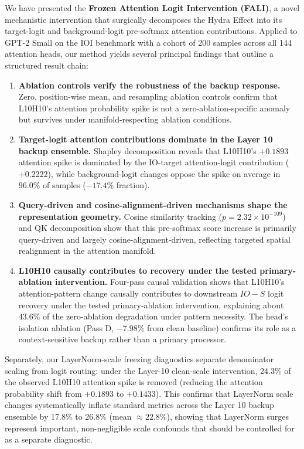 \documentclass[10pt]{article} %
\begin{document}
We have presented the \textbf{Frozen Attention Logit Intervention (FALI)}, a
novel mechanistic intervention that surgically decomposes the Hydra Effect into
its target-logit and background-logit pre-softmax attention contributions. Applied
to GPT-2 Small on the IOI benchmark with a cohort of 200 samples across all 144
attention heads, our method yields several principal findings that outline a structured result chain:

\begin{enumerate}
  \item \textbf{Ablation controls verify the robustness of the backup response.} Zero, position-wise mean, and resampling ablation controls confirm that L10H10's attention probability spike is not a zero-ablation-specific anomaly but survives under manifold-respecting ablation conditions.

  \item \textbf{Target-logit attention contributions dominate in the Layer 10 backup ensemble.} Shapley decomposition reveals that L10H10's $+0.1893$ attention spike is dominated by the IO-target attention-logit contribution ($+0.2222$), while background-logit changes oppose the spike on average in $96.0\%$ of samples ($-17.4\%$ fraction).

  \item \textbf{Query-driven and cosine-alignment-driven mechanisms shape the representation geometry.} Cosine similarity tracking ($p = 2.32 \times 10^{-109}$) and QK decomposition show that this pre-softmax score increase is primarily query-driven and largely cosine-alignment-driven, reflecting targeted spatial realignment in the attention manifold.

  \item \textbf{L10H10 causally contributes to recovery under the tested primary-ablation intervention.} Four-pass causal validation shows that L10H10's attention-pattern change causally contributes to downstream $IO - S$ logit recovery under the tested primary-ablation intervention, explaining about $43.6\%$ of the zero-ablation degradation under pattern necessity. The head's isolation ablation (Pass D, $-7.98\%$ from clean baseline) confirms its role as a context-sensitive backup rather than a primary processor.
\end{enumerate}

Separately, our LayerNorm-scale freezing diagnostics separate denominator scaling from logit routing: under the Layer-10 clean-scale intervention, 24.3\% of the observed L10H10 attention spike is removed (reducing the attention probability shift from $+0.1893$ to $+0.1433$). This confirms that LayerNorm scale changes systematically inflate standard metrics across the Layer 10 backup ensemble by 17.8\% to 26.8\% (mean $\approx 22.8\%$), showing that LayerNorm surges represent important, non-negligible scale confounds that should be controlled for as a separate diagnostic.
\end{document}
